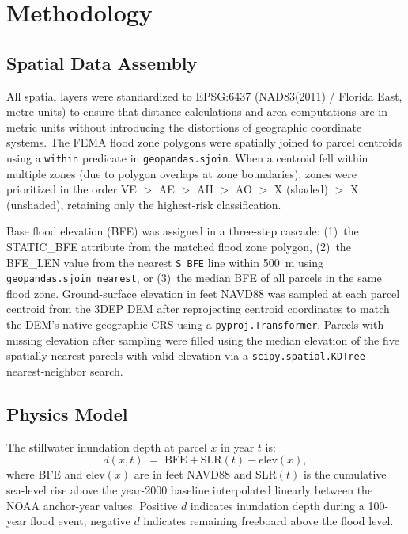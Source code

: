 \documentclass[conference]{IEEEtran}
\begin{document}
\section{Methodology}
\label{sec:methods}

\subsection{Spatial Data Assembly}

All spatial layers were standardized to EPSG:6437
(NAD83(2011) / Florida East, metre units) to ensure that distance
calculations and area computations are in metric units without
introducing the distortions of geographic coordinate systems.
The FEMA flood zone polygons were spatially joined to parcel centroids
using a \texttt{within} predicate in \texttt{geopandas.sjoin}.
When a centroid fell within multiple zones (due to polygon overlaps
at zone boundaries), zones were prioritized in the order
VE $>$ AE $>$ AH $>$ AO $>$ X (shaded) $>$ X (unshaded),
retaining only the highest-risk classification.

Base flood elevation (BFE) was assigned in a three-step cascade:
(1)~the STATIC\_BFE attribute from the matched flood zone polygon,
(2)~the BFE\_LEN value from the nearest \texttt{S\_BFE} line within
500~m using \texttt{geopandas.sjoin\_nearest}, or
(3)~the median BFE of all parcels in the same flood zone.
Ground-surface elevation in feet NAVD88 was sampled at each parcel
centroid from the 3DEP DEM after reprojecting centroid coordinates to
match the DEM's native geographic CRS using a \texttt{pyproj.Transformer}.
Parcels with missing elevation after sampling were filled using the
median elevation of the five spatially nearest parcels with valid
elevation via a \texttt{scipy.spatial.KDTree} nearest-neighbor search.

\subsection{Physics Model}

The stillwater inundation depth at parcel $x$ in year $t$ is:
\begin{equation}
  d(x, t) \;=\; \text{BFE} + \text{SLR}(t) - \text{elev}(x),
  \label{eq:depth}
\end{equation}
where BFE and elev$(x)$ are in feet NAVD88 and SLR$(t)$ is the
cumulative sea-level rise above the year-2000 baseline interpolated
linearly between the NOAA anchor-year values.
Positive $d$ indicates inundation depth during a 100-year flood event;
negative $d$ indicates remaining freeboard above the flood level.
\end{document}

